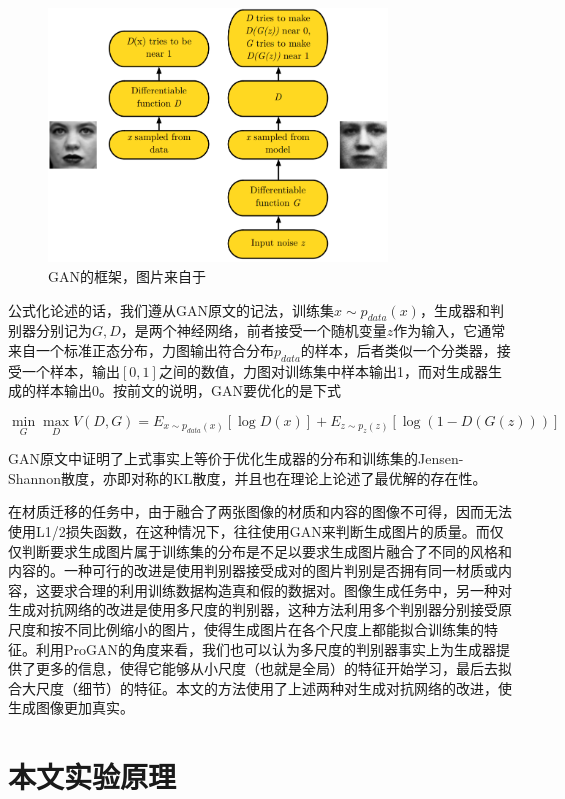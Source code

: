 \documentclass[UTF8,openany,AutoFakeBold,AutoFakeSlant,cs4size]{ctexbook}
\begin{document}
\begin{figure}
\centering
\includegraphics[width=9cm]{./images/gan_model.png}
\caption{GAN的框架，图片来自于\cite{goodfellow2016tutorial}}
\label{fig:sample}
\end{figure}

公式化论述的话，我们遵从GAN原文的记法，训练集$x \sim p_{data}(x)$，生成器和判别器分别记为$G, D$，是两个神经网络，前者接受一个随机变量$z$作为输入，它通常来自一个标准正态分布，力图输出符合分布$p_{data}$的样本，后者类似一个分类器，接受一个样本，输出$[0, 1]$之间的数值，力图对训练集中样本输出1，而对生成器生成的样本输出0。按前文的说明，GAN要优化的是下式

\begin{equation}
	\min_{G} \max_{D} V(D, G) = E_{x \sim p_{data}(x)}[\log D(x)] + E_{z \sim p_{z}(z)}[\log (1 - D(G(z)))]
\end{equation}

GAN原文中证明了上式事实上等价于优化生成器的分布和训练集的Jensen-Shannon散度，亦即对称的KL散度，并且也在理论上论述了最优解的存在性。


在材质迁移的任务中，由于融合了两张图像的材质和内容的图像不可得，因而无法使用L1/2损失函数，在这种情况下，往往使用GAN来判断生成图片的质量。而仅仅判断要求生成图片属于训练集的分布是不足以要求生成图片融合了不同的风格和内容的。一种可行的改进是使用判别器接受成对的图片判别是否拥有同一材质或内容\cite{ma2017pose}，这要求合理的利用训练数据构造真和假的数据对。图像生成任务中，另一种对生成对抗网络的改进是使用多尺度的判别器，这种方法利用多个判别器分别接受原尺度和按不同比例缩小的图片，使得生成图片在各个尺度上都能拟合训练集的特征。利用ProGAN\cite{Karras2017ProgressiveGO}的角度来看，我们也可以认为多尺度的判别器事实上为生成器提供了更多的信息，使得它能够从小尺度（也就是全局）的特征开始学习，最后去拟合大尺度（细节）的特征。本文的方法使用了上述两种对生成对抗网络的改进，使生成图像更加真实。

\section{本文实验原理}
\end{document}
